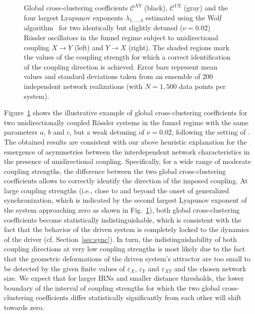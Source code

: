 \documentclass[graybox]{svmult}
\begin{document}
\begin{figure}
\caption{Global cross-clustering coefficients $\mathcal{C}^{XY}$ (black), $\mathcal{C}^{YX}$ (gray) and the four largest Lyapunov exponents $\lambda_{1,\dots,4}$ estimated using the Wolf algorithm~\cite{wolf1985} for two identically but slightly detuned ($\nu=0.02$) R\"ossler oscillators in the funnel regime subject to unidirectional coupling $X\to Y$ (left) and $Y\to X$ (right). The shaded regions mark the values of the coupling strength for which a correct identification of the coupling direction is achieved. Error bars represent mean values and standard deviations taken from an ensemble of 200 independent network realizations (with $N=1,500$ data points per system).}
\label{fig:roessler_coupling}
\end{figure}

Figure~\ref{fig:roessler_coupling} shows the illustrative example of global cross-clustering coefficients for two unidirectionally coupled R\"ossler systems in the funnel regime with the same parameters $a$, $b$ and $c$, but a weak detuning of $\nu=0.02$, following the setting of \cite{Feldhoff2012}. The obtained results are consistent with our above heuristic explanation for the emergence of asymmetries between the interdependent network characteristics in the presence of unidirectional coupling. Specifically, for a wide range of moderate coupling strengths, the difference between the two global cross-clustering coefficients allows to correctly identify the direction of the imposed coupling. At large coupling strengths (i.e., close to and beyond the onset of generalized synchronization, which is indicated by the second largest Lyapunov exponent of the system approaching zero as shown in Fig.~\ref{fig:roessler_coupling}), both global cross-clustering coefficients become statistically indistinguishable, which is consistent with the fact that the behavior of the driven system is completely locked to the dynamics of the driver (cf. Section~\ref{sec:sync}). In turn, the indistinguishability of both coupling directions at very low coupling strengths is most likely due to the fact that the geometric deformations of the driven system's attractor are too small to be detected by the given finite values of $\varepsilon_X$, $\varepsilon_Y$ and $\varepsilon_{XY}$ and the chosen network size. We expect that for larger IRNs and smaller distance thresholds, the lower boundary of the interval of coupling strengths for which the two global cross-clustering coefficients differ statistically significantly from each other will shift towards zero.
\end{document}
